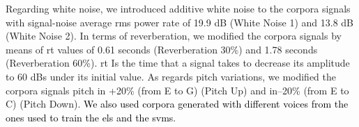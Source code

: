 \documentclass[10pt,letterpaper]{article}
\newcommand{\reviewertwo}[1]{\textcolor{black}{#1}}
\newcommand{\reviewerfour}[1]{\textcolor{black}{#1}}
\begin{document}



Regarding white noise, we introduced additive white noise to the corpora signals with signal-noise average \gls{rms} power rate of 19.9 dB (White Noise 1) and 13.8 dB (White Noise 2). In terms of reverberation, we modified the corpora signals by means of \gls{rt} values of 0.61 seconds (Reverberation 30\%) and 1.78 seconds (Reverberation 60\%). \gls{rt} Is the time that a signal takes to decrease its amplitude to 60 dBs under its initial value. As regards pitch variations, we modified the corpora signals pitch in +20\% (from E to G) (Pitch Up) and in--20\% (from E to C) (Pitch Down). \reviewerfour{We also used corpora generated with different voices from the ones used to train the \glspl{el} and the \glspl{svm}}.
\end{document}
